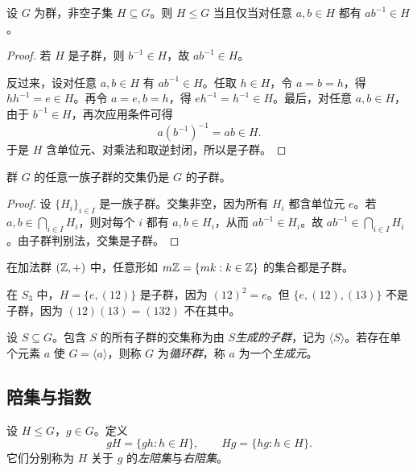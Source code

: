 \begin{theorem}[子群判别法]
设 $G$ 为群，非空子集 $H\subseteq G$。则 $H\le G$ 当且仅当对任意 $a,b\in H$ 都有 $ab^{-1}\in H$。
\end{theorem}

\begin{proof}
若 $H$ 是子群，则 $b^{-1}\in H$，故 $ab^{-1}\in H$。

反过来，设对任意 $a,b\in H$ 有 $ab^{-1}\in H$。任取 $h\in H$，令 $a=b=h$，得 $hh^{-1}=e\in H$。再令 $a=e,b=h$，得 $eh^{-1}=h^{-1}\in H$。最后，对任意 $a,b\in H$，由于 $b^{-1}\in H$，再次应用条件可得
\[
 a(b^{-1})^{-1}=ab \in H.
\]
于是 $H$ 含单位元、对乘法和取逆封闭，所以是子群。
\end{proof}

\begin{corollary}
群 $G$ 的任意一族子群的交集仍是 $G$ 的子群。
\end{corollary}

\begin{proof}
设 $\{H_i\}_{i\in I}$ 是一族子群。交集非空，因为所有 $H_i$ 都含单位元 $e$。若 $a,b\in \bigcap_{i\in I}H_i$，则对每个 $i$ 都有 $a,b\in H_i$，从而 $ab^{-1}\in H_i$。故 $ab^{-1}\in \bigcap_{i\in I}H_i$。由子群判别法，交集是子群。
\end{proof}

\begin{example}
在加法群 $(\mathbb{Z},+)$ 中，任意形如 $m\mathbb{Z}=\{mk:k\in \mathbb{Z}\}$ 的集合都是子群。
\end{example}

\begin{example}
在 $S_3$ 中，$H=\{e,(12)\}$ 是子群，因为 $(12)^2=e$。但 $\{e,(12),(13)\}$ 不是子群，因为 $(12)(13)=(132)$ 不在其中。
\end{example}

\begin{definition}
设 $S\subseteq G$。包含 $S$ 的所有子群的交集称为由 $S$\emph{生成的子群}，记为 $\langle S \rangle$。若存在单个元素 $a$ 使 $G=\langle a \rangle$，则称 $G$ 为\emph{循环群}，称 $a$ 为一个\emph{生成元}。
\end{definition}

\subsection*{陪集与指数}

\begin{definition}
设 $H\le G$，$g\in G$。定义
\[
 gH=\{gh:h\in H\}, \qquad Hg=\{hg:h\in H\}.
\]
它们分别称为 $H$ 关于 $g$ 的\emph{左陪集}与\emph{右陪集}。
\end{definition}

